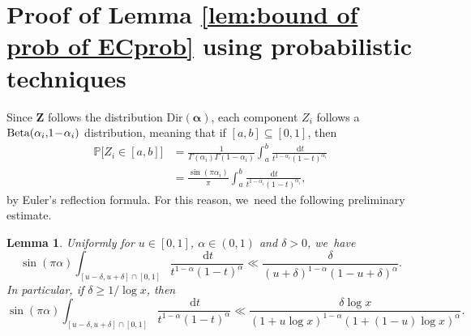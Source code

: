 \documentclass[JEP,XML,SOM,Unicode,published]{cedram}
\newcommand{\bZ}{{\boldsymbol Z}}
\newcommand{\PP}{\mathbb{P}}
\newcommand{\boldalpha}{\boldsymbol{\alpha}}
\newcommand{\dee}{\,\mathrm{d}}
\newcommand{\bg}{\big}
\theoremstyle{plain}
\newtheorem{lem}[cor]{Lemma}
\theoremstyle{definition}
\begin{document}
\section{Proof of Lemma \ref{lem:bound of prob of ECprob} using probabilistic techniques}\label{sec:boundary event Prob}

Since $\bZ$ follows the distribution $\text{Dir}(\boldalpha)$, each component $Z_i$ follows a \hbox{$\text{Beta}(\alpha_i,\mkern-3mu 1 \!-\! \alpha_i)$} distribution, meaning that if $[a,b]\subseteq[0,1]$, then
\begin{equation}
\label{eq:Zi distribution}
\begin{aligned}
\PP\bg[Z_i\in[a,b] \bg] &= \frac{1}{\Gamma(\alpha_i)\Gamma(1-\alpha_i)}\int_a^b \frac{\dee t}{t^{1-\alpha_i} (1-t)^{\alpha_i}}\\
&= \frac{\sin(\pi\alpha_i)}{\pi} \int_a^b \frac{\dee t}{t^{1-\alpha_i} (1-t)^{\alpha_i}},
\end{aligned}
\end{equation}
by Euler's reflection formula. For this reason, we~need the following preliminary estimate.

\begin{lem}\label{lem:beta estimate}
Uniformly for $u\in[0,1]$, $\alpha \in (0, 1)$ and $\delta > 0$, we~have
\[
\sin(\pi\alpha) \int_{[u-\delta,u+\delta]\cap[0,1]} \frac{\dee t}{t^{1-\alpha}(1-t)^\alpha} \ll \frac{\delta}{(u+\delta)^{1-\alpha}(1-u+\delta)^\alpha}.
\]
In particular, if $\delta\ge1/\log x$, then
\[
\sin(\pi\alpha) \int_{[u-\delta,u+\delta]\cap[0,1]} \frac{\dee t}{t^{1-\alpha}(1-t)^\alpha} \ll \frac{\delta\log x}{(1+u\log x)^{1-\alpha}(1+(1-u)\log x)^\alpha}.
\]
\end{lem}
\end{document}
